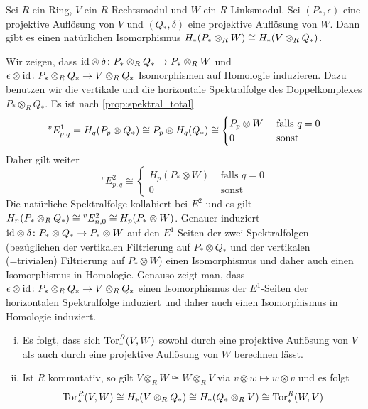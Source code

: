 \begin{satz}[label=satz:symmetrie_tor,{name=[{Homologie von Auflösungen der Faktoren des Tensorproduktes}]}]
	Sei $R$ ein Ring, $V$ ein $R$-Rechtsmodul und $W$ ein $R$-Linksmodul.
	Sei $(P_*,\epsilon)$ eine projektive Auflösung von $V$ und $(Q_*,\delta)$ eine projektive Auflösung von $W$.
	Dann gibt es einen natürlichen Isomorphismus $H_* \enbrace*{P_* \otimes_R W} \cong H_* \enbrace*{V \otimes_R Q_*}$.
\end{satz}
\begin{beweis}
	Wir zeigen, dass ${\operatorname{id}} \otimes \delta \colon P_* \otimes_R Q_* \to P_* \otimes_R W$ und $\epsilon \otimes \operatorname{id} \colon P_* \otimes_R Q_* \to V \otimes_R Q_*$ Isomorphismen auf Homologie induzieren.
	Dazu benutzen wir die vertikale und die horizontale Spektralfolge des Doppelkomplexes $P_* \otimes_R Q_*$.
	Es ist nach \autoref{prop:spektral_total}
	\[
		^v E^1_{p,q} = H_q \enbrace*{P_p \otimes Q_*} \cong P_p \otimes H_q(Q_*) \cong \begin{cases}
			P_p \otimes W &\text{ falls }q=0\\
			0 &\text{ sonst }
		\end{cases}
	\]
	Daher gilt weiter
	\[
		^v E^2_{p,q}\cong \begin{cases}
			H_p(P_*\otimes W) &\text{ falls }q=0\\
			0 &\text{ sonst }
		\end{cases}
	\]
	Die natürliche Spektralfolge kollabiert bei $E^2$ und es gilt $H_n \enbrace*{P_* \otimes_R Q_*} \cong {^v E^2_{n,0}} \cong H_p (P_* \otimes W)$.
	Genauer induziert ${\operatorname{id}} \otimes \delta \colon P_* \otimes Q_* \to P_* \otimes W$ auf den $E^1$-Seiten der zwei Spektralfolgen (bezüglichen der vertikalen Filtrierung auf $P_* \otimes Q_*$ und der vertikalen (=trivialen) Filtrierung auf $P_* \otimes W$) einen Isomorphismus und daher auch einen Isomorphismus in Homologie.
	Genauso zeigt man, dass $\epsilon \otimes \operatorname{id} \colon P_* \otimes_R Q_* \to V \otimes_R Q_*$ einen Isomorphismus der $E^1$-Seiten der horizontalen Spektralfolge induziert und daher auch einen Isomorphismus in Homologie induziert.
\end{beweis}

\begin{bemerkung}[{name=[{Symmetrie von Tor}]}]
	\leavevmode
	\begin{enumerate}[(i)]
		\item Es folgt, dass sich $\operatorname{Tor}_*^R(V,W)$ sowohl durch eine projektive Auflösung von $V$ als auch durch eine projektive Auflösung von $W$ berechnen lässt.
		\item Ist $R$ kommutativ, so gilt $V \otimes_R W \cong W \otimes_R V$ via $v \otimes w \mapsto w \otimes v$ und es folgt
		\[
			\Tor_*^R(V,W) \cong H_*\enbrace*{V \otimes_R Q_*} \cong H_* \enbrace*{Q_* \otimes_R V} \cong \Tor_*^R(W,V)
		\]
	\end{enumerate}
\end{bemerkung}

